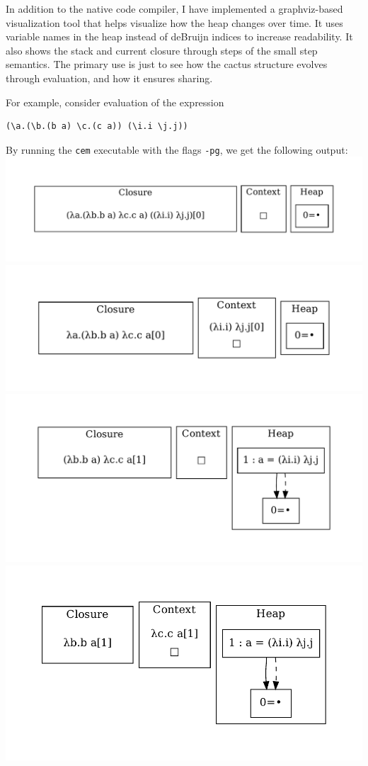 In addition to the native code compiler, I have implemented a graphviz-based
visualization tool that helps visualize how the heap changes over time. It uses
variable names in the heap instead of deBruijn indices to increase readability.
It also shows the stack and current closure through steps of the small step \ce
semantics. The primary use is just to see how the cactus structure evolves
through evaluation, and how it ensures sharing. 

For example, consider evaluation of the expression

\begin{verbatim}
(\a.(\b.(b a) \c.(c a)) (\i.i \j.j))
\end{verbatim}

By running the \texttt{cem} executable with the flags \texttt{-pg}, we get the
following output: 
\includegraphics[width=0.99\linewidth/2]{figures/1.pdf}
\includegraphics[width=0.99\linewidth/2]{figures/2.pdf}
\includegraphics[width=0.99\linewidth/2]{figures/3.pdf}
\includegraphics[width=0.99\linewidth/2]{figures/4.pdf}
